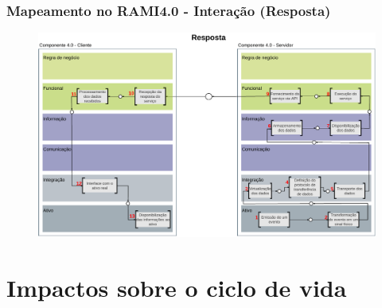\documentclass[10pt]{beamer}
\begin{document}
\begin{frame}
	\frametitle{Mapeamento no RAMI4.0 - Interação (Resposta)}
	
	\begin{figure}[htb]
		\centering
		\label{fig:rami-interacao-resposta}
		\includegraphics[width=1\textwidth]{rami-interacao-resposta}

	\end{figure}
	
\end{frame}

\section{Impactos sobre o ciclo de vida}
\end{document}
